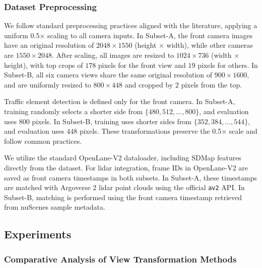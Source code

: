 \subsubsection{Dataset Preprocessing}
\label{sup_sec: dataset_preprocessing}

We follow standard preprocessing practices aligned with the literature, applying a uniform 0.5× scaling to all camera inputs. In Subset-A, the front camera images have an original resolution of $2048 \times 1550$ (height $\times$ width), while other cameras are $1550 \times 2048$. After scaling, all images are resized to $1024 \times 736$ (width $\times$ height), with top crops of $178$ pixels for the front view and $19$ pixels for others. In Subset-B, all six camera views share the same original resolution of $900 \times 1600$, and are uniformly resized to $800 \times 448$ and cropped by $2$ pixels from the top.

Traffic element detection is defined only for the front camera. In Subset-A, training randomly selects a shorter side from $\{480, 512, \dots, 800\}$, and evaluation uses $800$ pixels. In Subset-B, training uses shorter sides from $\{352, 384, \dots, 544\}$, and evaluation uses $448$ pixels. These transformations preserve the 0.5× scale and follow common practices.

We utilize the standard OpenLane-V2 dataloader, including SDMap features directly from the dataset. For lidar integration, frame IDs in OpenLane-V2 are saved as front camera timestamps in both subsets. In Subset-A, these timestamps are matched with Argoverse 2 lidar point clouds using the official \texttt{av2} API. In Subset-B, matching is performed using the front camera timestamp retrieved from nuScenes sample metadata.


\subsection{Experiments}
\label{sup_sec: experiments}

\subsubsection{Comparative Analysis of View Transformation Methods}

